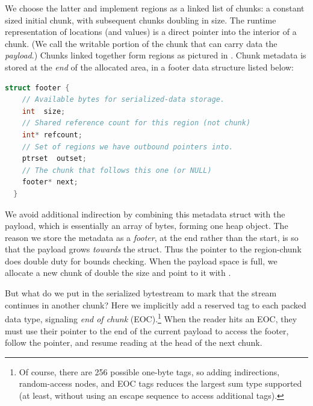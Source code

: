 We choose the latter and implement regions as a linked list of chunks: a
constant sized initial chunk, with subsequent chunks doubling in size.
%
The runtime representation of locations (and  values)
is a direct pointer into the interior of a chunk.
(We call the writable portion of the chunk that can carry data the {\em payload}.)
Chunks linked together form regions as pictured in
.  Chunk metadata is stored at the \emph{end} of the
allocated area, in a footer data structure listed below:
%
\begin{lstlisting}[language=C++]
  struct footer {
    // Available bytes for serialized-data storage.
    int  size;
    // Shared reference count for this region (not chunk)
    int* refcount;
    // Set of regions we have outbound pointers into.
    ptrset  outset;
    // The chunk that follows this one (or NULL)
    footer* next;
  }
\end{lstlisting}
We avoid additional indirection by combining this metadata struct with the
payload, which is essentially an array of bytes, forming one heap object.
The reason we store the metadata as a \emph{footer}, at the end rather than the
start, is so that the payload grows \emph{towards} the struct.  Thus the pointer
to the region-chunk does double duty for bounds checking.  When the payload
space is full, we allocate a new chunk of double the size and point to it with
.

But what do we put in the serialized bytestream to mark that the stream
continues in another chunk?  Here we implicitly add a reserved tag to each
packed data type, signaling {\em end of chunk} (EOC).\footnote{Of course, there
  are 256 possible one-byte tags, so adding indirections, random-access nodes,
  and EOC tags reduces the largest sum type supported (at least, without using
  an escape sequence to access additional tags).}
%
When the reader hits an EOC, they must use their pointer to the end of the
current payload to access the footer, follow the  pointer, and resume
reading at the head of the next chunk.



